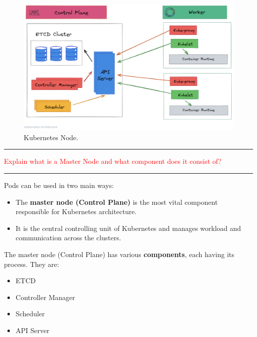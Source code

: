 \documentclass{article}
\begin{document}
\begin{figure}
\centering
\includegraphics[width=0.95\linewidth]{k8sDiagrams/k8sArchitectureComponents.png}
\caption{\label{fig:k8sNode}Kubernetes Node.}
\end{figure} 


\noindent
{\color{red} \rule{\linewidth}{0.5mm}}
\textcolor{red}{Explain what is a Master Node and what component does it consist of?} \\
\noindent
{\color{red} \rule{\linewidth}{0.5mm}}
Pods can be used in two main ways:
\begin{itemize}
    \item The \textbf{ master node (Control Plane)} is the most vital component responsible for Kubernetes architecture.
    \item It is the central controlling unit of Kubernetes and manages workload and communication across the clusters. 
\end{itemize}
The master node (Control Plane) has various \textbf{  components}, each having its process. They are:
\begin{itemize}
    \item ETCD
    \item Controller Manager
    \item Scheduler
    \item API Server
\end{itemize}
\end{document}
